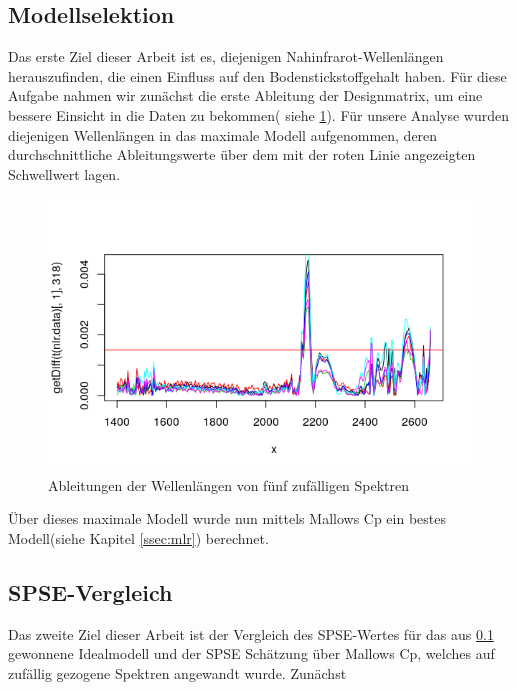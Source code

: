 	\subsection{Modellselektion}
	\label{ssec:modellselektion}
	Das erste Ziel dieser Arbeit ist es, diejenigen Nahinfrarot-Wellenlängen herauszufinden, die einen Einfluss auf den Bodenstickstoffgehalt haben.
	Für diese Aufgabe nahmen wir zunächst die erste Ableitung der Designmatrix, um eine bessere Einsicht in die Daten zu bekommen( siehe \ref{Wellenlängen_erste_Ableitung}). Für unsere Analyse wurden diejenigen Wellenlängen in das maximale Modell aufgenommen, deren durchschnittliche Ableitungswerte über dem mit der roten Linie angezeigten Schwellwert lagen. 
	\begin{figure}
		\label{Wellenlängen_erste_Ableitung}
		\includegraphics[width=\textwidth]{img/wave_1dev.png}
		\caption{Ableitungen der Wellenlängen von fünf zufälligen Spektren}
	\end{figure}
	Über dieses maximale Modell wurde nun mittels Mallows Cp ein bestes Modell(siehe Kapitel \ref{ssec:mlr}) berechnet.
	
	\subsection{SPSE-Vergleich}
	Das zweite Ziel dieser Arbeit ist der Vergleich des SPSE-Wertes für das aus \ref{ssec:modellselektion} gewonnene Idealmodell und der SPSE Schätzung über Mallows Cp, welches auf zufällig gezogene Spektren angewandt wurde. 
	Zunächst 

	
	
	
		
		


